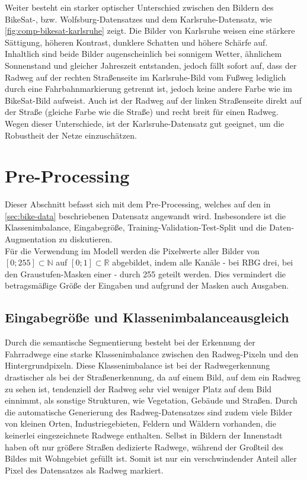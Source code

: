 Weiter besteht ein starker optischer Unterschied zwischen den Bildern des BikeSat-, bzw. Wolfsburg-Datensatzes 
und dem Karlsruhe-Datensatz, wie \autoref{fig:comp-bikesat-karlsruhe} zeigt. Die Bilder von Karlsruhe weisen
eine stärkere Sättigung, höheren Kontrast, dunklere Schatten und höhere Schärfe auf. Inhaltlich sind beide 
Bilder augenscheinlich bei sonnigem Wetter, ähnlichem Sonnenstand und gleicher Jahreszeit entstanden, jedoch 
fällt sofort auf, dass der Radweg auf der rechten Straßenseite im Karlsruhe-Bild vom Fußweg lediglich durch 
eine Fahrbahnmarkierung getrennt ist, jedoch keine andere Farbe wie im BikeSat-Bild aufweist. Auch ist der Radweg auf 
der linken Straßenseite direkt auf der Straße (gleiche Farbe wie die Straße) und recht breit für einen Radweg.   
Wegen dieser Unterschiede, ist der Karlsruhe-Datensatz gut geeignet, um die Robustheit der Netze einzuschätzen. 


\section{Pre-Processing} \label{sec:pre-processing}

Dieser Abschnitt befasst sich mit dem Pre-Processing, welches auf den in \autoref{sec:bike-data} 
beschriebenen Datensatz angewandt wird. Insbesondere ist die Klassenimbalance, Eingabegröße, 
Training-Validation-Test-Split und die Daten-Augmentation zu diskutieren. \\
Für die Verwendung im Modell werden die Pixelwerte aller Bilder von $[0; 255] \subset \mathbb{N}$
auf $[0;1] \subset \mathbb{R}$ abgebildet, indem alle Kanäle - bei RBG drei, bei den Graustufen-Masken einer - durch 255 geteilt werden.
Dies vermindert die betragsmäßige Größe der Eingaben und aufgrund der Masken auch Ausgaben. 

\subsection{Eingabegröße und Klassenimbalanceausgleich}

Durch die semantische Segmentierung besteht bei der Erkennung der Fahrradwege eine starke 
Klassenimbalance zwischen den Radweg-Pixeln und den Hintergrundpixeln. Diese Klassenimbalance ist bei der Radwegerkennung drastischer 
als bei der Straßenerkennung, da auf einem Bild, auf dem ein Radweg zu sehen ist, 
tendenziell der Radweg sehr viel weniger Platz auf dem Bild einnimmt, als sonstige Strukturen, wie Vegetation, Gebäude und Straßen. 
Durch die automatische Generierung des Radweg-Datensatzes sind zudem viele Bilder von kleinen Orten,
Industriegebieten, Feldern und Wäldern vorhanden, die keinerlei eingezeichnete Radwege enthalten. 
Selbst in Bildern der Innenstadt haben oft nur größere Straßen dedizierte Radwege, während der 
Großteil des Bildes mit Wohngebiet gefüllt ist. 
Somit ist nur ein verschwindender Anteil aller Pixel des Datensatzes als Radweg markiert. 


